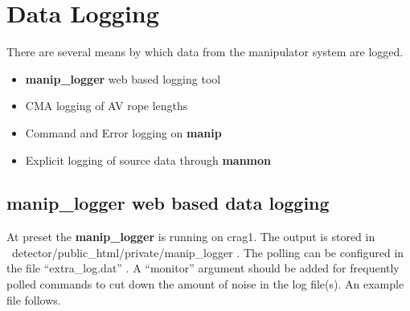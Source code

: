 \section{Data Logging}
  
  There are several means by which data from the manipulator
system are logged.
\begin{itemize}
\item {\bf manip\_logger} web based logging tool
\item CMA logging of AV rope lengths
\item Command and Error logging on {\bf manip}
\item Explicit logging of source data through {\bf manmon}
\end{itemize}
   

\subsection{manip\_logger web based data logging}

 At preset the {\bf manip\_logger } is running on crag1. The output is stored in
~detector/public\_html/private/manip\_logger . The polling can be configured in
the file ``extra\_log.dat''  . A ``monitor'' argument should be added for frequently
polled commands to cut down the amount of noise in the log file(s).
An example file follows.

